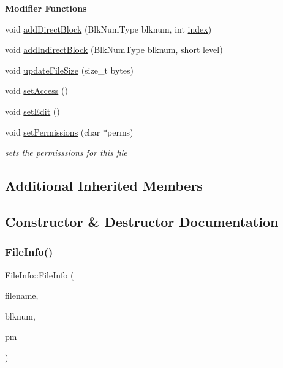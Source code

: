 \begin{Indent}\textbf{ Modifier Functions}\par
\begin{DoxyCompactItemize}
\item 
void \mbox{\hyperlink{classFileInfo_a83e728ab41847e3b0d4eee9c98b89965}{add\+Direct\+Block}} (Blk\+Num\+Type blknum, int \mbox{\hyperlink{structindex}{index}})
\item 
void \mbox{\hyperlink{classFileInfo_a59e56b96bc289112ed0f967c7cd60ed9}{add\+Indirect\+Block}} (Blk\+Num\+Type blknum, short level)
\item 
void \mbox{\hyperlink{classFileInfo_ae0389f01dbb6b4d365d1d062a9f5b146}{update\+File\+Size}} (size\+\_\+t bytes)
\item 
void \mbox{\hyperlink{classFileInfo_aba223845c8a1e7091626e6d241e5f069}{set\+Access}} ()
\item 
void \mbox{\hyperlink{classFileInfo_a911b6fe0c76dbeb57613f447106b4d6a}{set\+Edit}} ()
\item 
void \mbox{\hyperlink{classFileInfo_ab2b69861ecef1b8e0f465906c8eaa7a7}{set\+Permissions}} (char $\ast$perms)
\begin{DoxyCompactList}\small\item\em sets the permisssions for this file \end{DoxyCompactList}\end{DoxyCompactItemize}
\end{Indent}
\subsection*{Additional Inherited Members}


\subsection{Constructor \& Destructor Documentation}
\mbox{\label{classFileInfo_a3586bb4f50c4a0f63ff4ea0a1e56ce9c}} 
\subsubsection{\texorpdfstring{File\+Info()}{FileInfo()}}
{\footnotesize\ttfamily File\+Info\+::\+File\+Info (\begin{DoxyParamCaption}\item[{string}]{filename,  }\item[{Blk\+Num\+Type}]{blknum,  }\item[{\mbox{\hyperlink{classPartitionManager}{Partition\+Manager}} $\ast$}]{pm }\end{DoxyParamCaption})}


